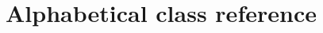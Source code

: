 \chapter{Alphabetical class reference}\label{classref}
%
\setfooter{\thepage}{}{}{}{}{\thepage}%
%
%
\begin{comment}
\helpignore{\section{Class hierarchy}%

The GUI-specific wxWindows class hierarchy is shown in Figure 5.1.
Many other, non-GUI classes have been omitted.

\vskip 1cm
$$\image{14cm;0cm}{wxclass.ps}$$
\vskip 1cm
\centerline{Figure 5.1: wxWindows class hierarchy}

\newpage}%

\overview{Writing a wxWindows application: a rough guide}{roughguide}

\helponly{
\sethotspotcolour{off}%
\large{
\helpref{Notes on using the reference}{referencenotes}\\
\helpref{Guide to functions}{functions}
\sethotspotcolour{on}%
}}
\end{comment}

